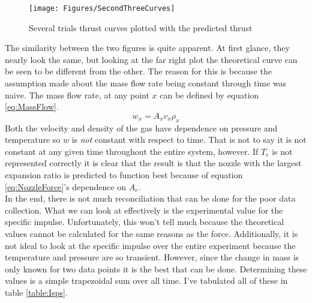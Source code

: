 \begin{figure}[h!]
\centering
\texttt{[image: Figures/SecondThreeCurves]}
\caption{Several trials thrust curves plotted with the predicted thrust}
\label{fig:SecondThreeCurves}
\end{figure}
The similarity between the two figures is quite apparent. At first glance, they nearly look the same, but looking at the far right plot the theoretical curve can be seen to be different from the other. The reason for this is because the assumption made about the mass flow rate being constant through time was naive. The mass flow rate, at any point $x$  can be defined by equation \ref{eq:MassFlow}.
\begin{equation}\label{eq:MassFlow}
w_x=A_x v_x \rho_x
\end{equation}%
%
Both the velocity and density of the gas have dependence on pressure and temperature so $w$ is \textit{not} constant with respect to time. That is not to say it is not constant at any given time throughout the entire system, however. If $T_e$ is not represented correctly it is clear that the result is that the nozzle with the largest expansion ratio is predicted to function best because of equation \ref{eq:NozzleForce}'s dependence on $A_e$. \\
In the end, there is not much reconciliation that can be done for the poor data collection. What we can look at effectively is the experimental value for the specific impulse. Unfortunately, this won't tell much because the theoretical values cannot be calculated for the same reasons as the force. Additionally, it is not ideal to look at the specific impulse over the entire experiment because the temperature and pressure are so transient. However, since the change in mass is only known for two data points it is the best that can be done. Determining these values is a simple trapezoidal sum over all time. I've tabulated all of these in table \ref{table:Isps}.
